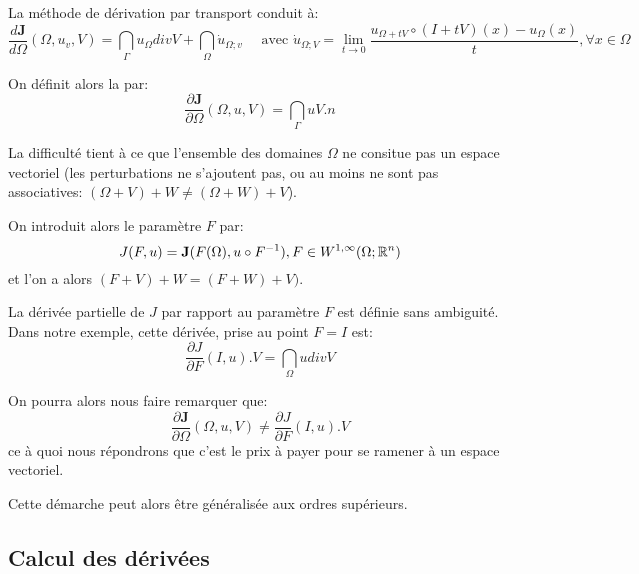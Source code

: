 La méthode de dérivation par transport conduit à:
\begin{equation}
\dfrac{d{\mathbf J}}{d\Omega}(\Omega, u_v,V)=\dint_\Gamma u_\Omega div V + \dint_\Omega \dot{u}_{\Omega;v} 
\quad \text{ avec }
\dot{u}_{\Omega;V}=\lim_{t\rightarrow0} \dfrac{u_{\Omega+tV}\circ (I+tV)(x)-u_\Omega(x)}t, \forall x\in\Omega
\end{equation}

On définit alors la 
par:
\begin{equation}
\dfrac{\partial{\mathbf J}}{\partial\Omega}(\Omega, u,V) = \dint_\Gamma u V.n
\end{equation}


La difficulté tient à ce que l'ensemble des domaines $\Omega$ ne consitue pas un espace vectoriel
(les perturbations ne s'ajoutent pas, ou au moins ne sont pas associatives: 
$(\Omega+V)+W\ne(\Omega+W)+V$).

\medskip
{}
On introduit alors le paramètre $F$ par:
\begin{equation}
J(F,u)={\mathbf J}(F(\Omega),u\circ F^{-1}), F\in W^{1,\infty}(\Omega;\mathbb R^n)
\end{equation}
et l'on a alors $(F+V)+W=(F+W)+V)$.

La dérivée partielle de $J$ par rapport au paramètre $F$ est définie sans ambiguité.
Dans notre exemple, cette dérivée, prise au point $F=I$ est:
\begin{equation}
\dfrac{\partial J}{\partial F}(I,u).V = \dint_\Omega u div V
\end{equation}

On pourra alors nous faire remarquer que:
\begin{equation}
\dfrac{\partial{\mathbf J}}{\partial\Omega}(\Omega, u,V)
\ne
\dfrac{\partial J}{\partial F}(I,u).V
\end{equation}
ce à quoi nous répondrons que c'est le prix à payer pour se ramener à un espace
vectoriel.

Cette démarche peut alors être généralisée aux ordres supérieurs.


\medskip
\subsection{Calcul des dérivées}

